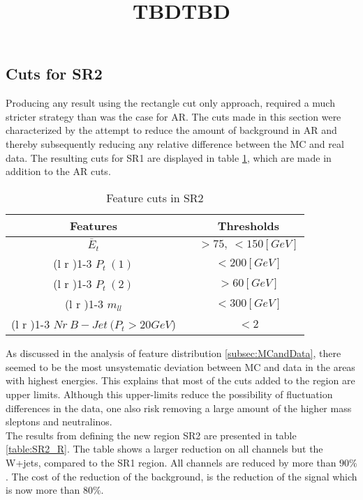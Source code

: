 \documentclass{article}
\begin{document}
\subsection{Cuts for SR2}
Producing any result using the rectangle cut only approach, required a much stricter strategy than was the case for AR. The cuts made in this section were characterized by the attempt to reduce the amount of background in AR and thereby subsequently reducing any relative difference between the MC and real data. The resulting cuts for SR1 are displayed in table \ref{table:AR}, which are made in addition to the AR cuts. \\
\bgroup
\title{TBD}
{\tabcolsep=20pt
\begin{table}
    \caption{Feature cuts in SR2}
    \label{table:AR}
    \centering 
    \begin{threeparttable}
    \begin{tabular}{ccc}
    \textbf{Features} & & \textbf{Thresholds}\\
     \midrule\midrule
    $\bar{E}_t$   & &  $ > 75, \ < 150[GeV]$  \\%
    \cmidrule(l  r ){1-3}
     $P_t \ (1)$ & &  $< 200[GeV]$  \\ 
    \cmidrule(l r ){1-3}
     $P_t \ (2)$ & & $> 60[GeV]$  \\ 
    \cmidrule(l r ){1-3}
    $m_{ll}$ & & $< 300[GeV]$  \\
    \cmidrule(l r ){1-3}
    $Nr\ B-Jet\  (P_t>20GeV$) & & $< 2$  \\ 
    \midrule\midrule
    \end{tabular}
    \end{threeparttable}
\end{table}
}
\egroup
As discussed in the analysis of feature distribution \ref{subsec:MCandData}, there seemed to be the most unsystematic deviation between MC and data in the areas with highest energies. This explains that most of the cuts added to the region are upper limits. Although this upper-limits reduce the possibility of fluctuation differences in the data, one also risk removing a large amount of the higher mass sleptons and neutralinos. 
\\
The results from defining the new region SR2 are presented in table \ref{table:SR2_R}. The table shows a larger reduction on all channels but the W+jets, compared to the SR1 region. All channels are reduced by more than $90\%$. The cost of the reduction of the background, is the reduction of the signal which is now more than $80\%$.
\bgroup
\title{TBD}
\end{document}

